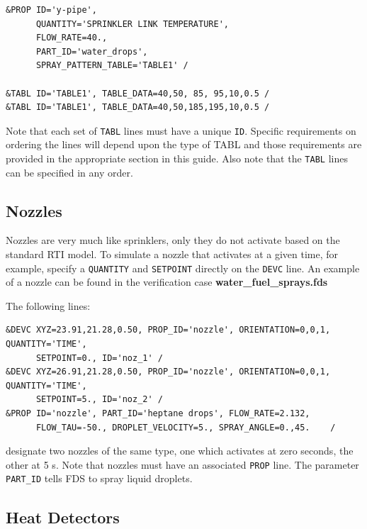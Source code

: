 \documentclass[11pt]{book}
\newcommand{\ct}{\tt\small}
\begin{document}
\footnotesize
\begin{verbatim}
&PROP ID='y-pipe',
      QUANTITY='SPRINKLER LINK TEMPERATURE',
      FLOW_RATE=40.,
      PART_ID='water_drops',
      SPRAY_PATTERN_TABLE='TABLE1' /

&TABL ID='TABLE1', TABLE_DATA=40,50, 85, 95,10,0.5 /
&TABL ID='TABLE1', TABLE_DATA=40,50,185,195,10,0.5 /
\end{verbatim}
\normalsize

\begin{warning}
\noindent
Note that each set of {\ct TABL} lines must have a unique {\ct ID}.  Specific requirements on ordering the lines
will depend upon the type of TABL and those requirements are provided in the appropriate section in this guide. Also note that
the {\ct TABL} lines can be specified in any order.
\end{warning}





\subsection{Nozzles}
\label{info:nozzles}

Nozzles are very much like sprinklers, only they do not activate based on the standard RTI model.
To simulate a nozzle that activates at a given time, for example,
specify a {\ct QUANTITY} and {\ct SETPOINT} directly on the {\ct DEVC} line.
An example of a nozzle can be found in the verification case {\bf water\_fuel\_sprays.fds}

The following lines:
\footnotesize
\begin{verbatim}
&DEVC XYZ=23.91,21.28,0.50, PROP_ID='nozzle', ORIENTATION=0,0,1, QUANTITY='TIME',
      SETPOINT=0., ID='noz_1' /
&DEVC XYZ=26.91,21.28,0.50, PROP_ID='nozzle', ORIENTATION=0,0,1, QUANTITY='TIME',
      SETPOINT=5., ID='noz_2' /
&PROP ID='nozzle', PART_ID='heptane drops', FLOW_RATE=2.132,
      FLOW_TAU=-50., DROPLET_VELOCITY=5., SPRAY_ANGLE=0.,45.    /
\end{verbatim}
\normalsize

\noindent
designate two nozzles of the same type, one which activates at zero seconds, the other at 5 s. Note that nozzles must have an
associated {\ct PROP} line. The parameter {\ct PART\_ID} tells FDS to spray liquid droplets.




\subsection{Heat Detectors}
\label{info:heat_detectors}
\end{document}
